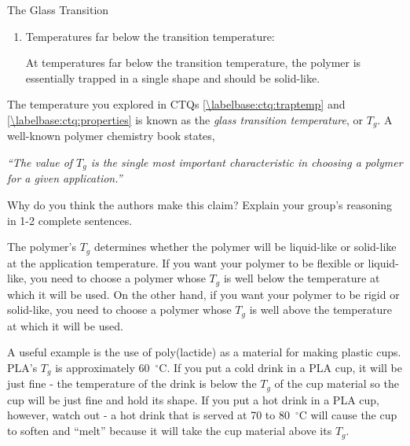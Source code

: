 \begin{activity}{The Glass Transition}
\begin{ctqs}
\begin{enumerate}
				\begin{solution}[0.5in]
					At temperatures far above the transition temperature, the polymer is dynamic, has plenty of room to move around, and should be able to flow, so should be liquid-like.
				\end{solution}
			
			\item Temperatures far below the transition temperature:
			
				\begin{solution}[0.5in]
					At temperatures far below the transition temperature, the polymer is essentially trapped in a single shape and should be solid-like.
				\end{solution}
			
		\end{enumerate}
		
	\question The temperature you explored in CTQs \ref{\labelbase:ctq:traptemp} and \ref{\labelbase:ctq:properties} is known as the \emph{glass transition temperature}, or $T_g$.  A well-known polymer chemistry book states,
	
		\emph{``The value of $T_g$ is the single most important characteristic in choosing a polymer for a given application.''}
		
		Why do you think the authors make this claim?  Explain your group's reasoning in 1-2 complete sentences.
			
				\begin{solution}[1.5in]
				
					The polymer's $T_g$ determines whether the polymer will be liquid-like or solid-like at the application temperature.  If you want your polymer to be flexible or liquid-like, you need to choose a polymer whose $T_g$ is well below the temperature at which it will be used.  On the other hand, if you want your polymer to be rigid or solid-like, you need to choose a polymer whose $T_g$ is well above the temperature at which it will be used.
					
					A useful example is the use of poly(lactide) as a material for making plastic cups.  PLA's $T_g$ is approximately 60~$^\circ$C.  If you put a cold drink in a PLA cup, it will be just fine - the temperature of the drink is below the $T_g$ of the cup material so the cup will be just fine and hold its shape.  If you put a hot drink in a PLA cup, however, watch out - a hot drink that is served at 70 to 80~$^\circ$C will cause the cup to soften and ``melt'' because it will take the cup material above its $T_g$.
				

\end{solution}
\end{ctqs}
\end{activity}
